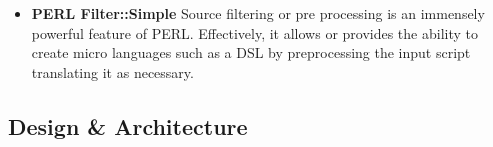 \begin{multicols}{2}
\begin{itemize}
				\item \textbf{PERL Filter::Simple}	
					\newline								
					Source filtering or pre processing is an immensely powerful feature of PERL. 
					Effectively, it allows or provides the ability to create micro languages such as a DSL by
					preprocessing the input script translating it as necessary.
					
			\end{itemize}	
		
		\end{multicols}	
	
	\subsection{Design \& Architecture}
							
